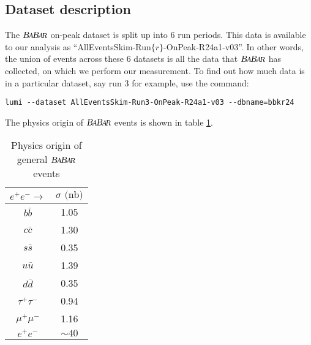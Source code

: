 \documentclass{article}
\renewcommand{\(}{\left(}
\renewcommand{\)}{\right)}
\numberwithin{equation}{section}
\begin{document}
\subsection{Dataset description}
The $\babar$ on-peak dataset is split up into 6 run periods. This data is available to our analysis as ``AllEventsSkim-Run$\{r\}$-OnPeak-R24a1-v03''. In other words, the union of events across these 6 datasets is all the data that $\babar$ has collected, on which we perform our measurement. To find out how much data is in a particular dataset, say run 3 for example, use the command: 
\begin{verbatim}
lumi --dataset AllEventsSkim-Run3-OnPeak-R24a1-v03 --dbname=bbkr24
\end{verbatim}

The physics origin of $\babar$ events is shown in table \ref{xsec_raw}.
\begin{table}[H]
  \begin{center}
    \begin{tabular}{ c c }
      $e^+e^-\rightarrow$ & $\sigma\text{ (nb)}$ \\
      \hline\hline
      $b\bar{b}$ & 1.05 \\
      \hline
      $c\bar{c}$ & 1.30 \\
      \hline
      $s\bar{s}$ & 0.35 \\
      \hline
      $u\bar{u}$ & 1.39 \\
      \hline
      $d\bar{d}$ & 0.35 \\
      \hline
      $\tau^+\tau^-$ & 0.94 \\
      \hline
      $\mu^+\mu^-$ & 1.16 \\
      \hline
      $e^+e^-$ & $\sim 40$ \\
      \hline
    \end{tabular}
  \end{center}
  \caption{Physics origin of general $\babar$ events}
  \label{xsec_raw}
\end{table}
\end{document}
